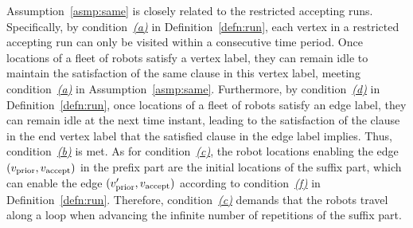 \documentclass[Afour,sageh,times]{sagej}
\newcommand{\vertex}[1]{v_{\textup{#1}}}
\begin{document}
Assumption~\ref{asmp:same} is closely related to the restricted accepting runs. Specifically, by condition~\hyperref[cond:a]{\it (a)} in Definition~\ref{defn:run}, each vertex in a restricted accepting run can only be visited within a consecutive time period.  Once locations of a fleet of robots satisfy a  vertex label, they can remain idle to maintain the satisfaction of the same clause in this vertex label, meeting condition~\hyperref[asmp:a]{\it (a)} in Assumption~\ref{asmp:same}. Furthermore, by condition~\hyperref[cond:d]{\it (d)} in Definition~\ref{defn:run}, once locations of a fleet of  robots satisfy an edge label, they can remain idle at the next time instant, leading to the satisfaction of the clause in the end vertex label that the satisfied clause in the edge label implies. Thus, condition~\hyperref[asmp:b]{\it (b)} is  met. As for condition~\hyperref[asmp:c]{\it (c)}, the robot locations  enabling the edge $(\vertex{prior}, \vertex{accept})$ in the prefix part are the initial locations of the suffix part, which can enable the edge  $(\vertex{prior}', \vertex{accept})$ according to condition~\hyperref[cond:f]{\it (f)} in Definition~\ref{defn:run}. Therefore, condition~\hyperref[asmp:c]{\it (c)} demands that the robots travel along a loop when advancing the infinite number of repetitions of the suffix part.
\end{document}

